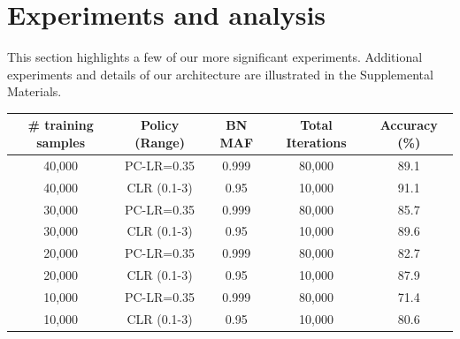 \documentclass{article}
\begin{document}


\section{Experiments and analysis}
\label{sec:exp}

This section highlights a few of our more significant experiments. Additional experiments and details of our architecture are illustrated in the Supplemental Materials.  


\begin{table}[tb]
	\begin{center}
		\begin{tabular}{| c | c | c | c | c | }
			\hline
			\# training samples & Policy (Range)  & BN MAF &  Total Iterations &Accuracy (\%) \\ \hline
			40,000 & PC-LR=0.35  & 0.999 & 80,000 & 89.1 \\ \hline
			40,000 & CLR (0.1-3) & 0.95  & 10,000 & 91.1 \\ \hline
			30,000 & PC-LR=0.35  & 0.999 & 80,000 & 85.7 \\ \hline
			30,000 & CLR (0.1-3) & 0.95  & 10,000 & 89.6 \\ \hline
			20,000 & PC-LR=0.35  & 0.999 & 80,000 & 82.7 \\ \hline
			20,000 & CLR (0.1-3) & 0.95  & 10,000 & 87.9 \\ \hline
			10,000 & PC-LR=0.35  & 0.999 & 80,000 & 71.4 \\ \hline
			10,000 & CLR (0.1-3) & 0.95  & 10,000 & 80.6 \\ \hline

\end{tabular}
\end{center}
\end{table}
\end{document}
